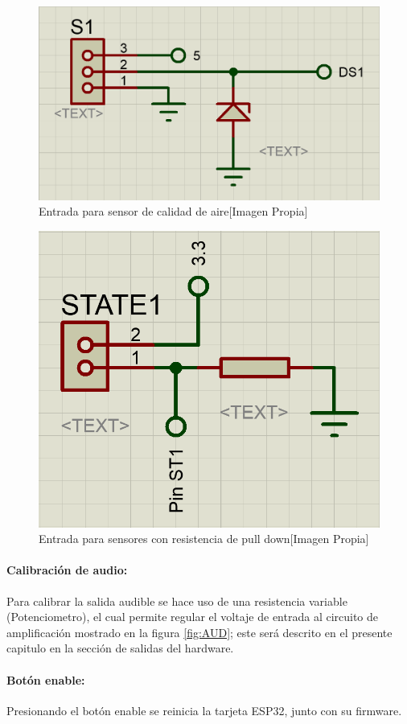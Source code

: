		\begin{figure}[H]
			\centering
			\caption{Entrada para sensor de calidad de aire[Imagen Propia]}
			\label{fig:S1Aire}
			\includegraphics[width=0.6\linewidth]{Imagenes/S1Aire}
		\end{figure}
	
		\begin{figure}[H]
			\centering
			\caption{Entrada para sensores con resistencia de pull down[Imagen Propia]}
			\label{fig:ST}
			\includegraphics[width=0.5\linewidth]{Imagenes/ST}
		\end{figure}		
	
	\paragraph{Calibración de audio:}
		Para calibrar la salida audible se hace uso de una resistencia variable (Potenciometro), el cual permite regular el voltaje de entrada al circuito de amplificación mostrado en la figura \ref{fig:AUD}; este será descrito en el presente capitulo en la sección de salidas del hardware.\\ 
		
	\paragraph{Botón enable:}
		Presionando el botón enable se reinicia la tarjeta ESP32, junto con su firmware.\\
		
